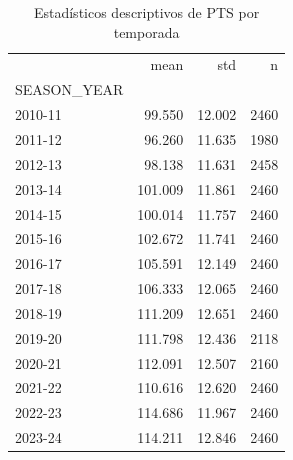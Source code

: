 \begin{table}
\caption{Estadísticos descriptivos de PTS por temporada}
\label{tab:anova-desc-pts}
\begin{tabular}{lrrr}
\toprule
 & mean & std & n \\
SEASON_YEAR &  &  &  \\
\midrule
2010-11 & 99.550 & 12.002 & 2460 \\
2011-12 & 96.260 & 11.635 & 1980 \\
2012-13 & 98.138 & 11.631 & 2458 \\
2013-14 & 101.009 & 11.861 & 2460 \\
2014-15 & 100.014 & 11.757 & 2460 \\
2015-16 & 102.672 & 11.741 & 2460 \\
2016-17 & 105.591 & 12.149 & 2460 \\
2017-18 & 106.333 & 12.065 & 2460 \\
2018-19 & 111.209 & 12.651 & 2460 \\
2019-20 & 111.798 & 12.436 & 2118 \\
2020-21 & 112.091 & 12.507 & 2160 \\
2021-22 & 110.616 & 12.620 & 2460 \\
2022-23 & 114.686 & 11.967 & 2460 \\
2023-24 & 114.211 & 12.846 & 2460 \\
\bottomrule
\end{tabular}
\end{table}
